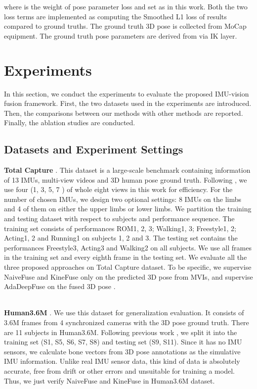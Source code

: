 \documentclass[lettersize,journal]{IEEEtran}
\begin{document}
where  is the weight of pose parameter loss and set as  in this work. Both the two loss terms are implemented as computing the Smoothed L1 loss of results compared to ground truths. The ground truth 3D pose  is collected from MoCap equipment. The ground truth pose parameters  are derived from  via IK layer.
\section{Experiments}

In this section, we conduct the experiments to evaluate the proposed IMU-vision fusion framework. First, the two datasets used in the experiments are introduced. Then, the comparisons between our methods with other methods are reported. Finally, the ablation studies are conducted.

\subsection{Datasets and Experiment Settings}

\noindent \textbf{Total Capture} \cite{trumble2017total}.
\quad This dataset is a large-scale benchmark containing information of 13 IMUs, multi-view videos and 3D human pose ground truth. Following \cite{zhang2020fusing,trumble2017total}, we use four (1, 3, 5, 7 ) of whole eight views in this work for efficiency. For the number of chosen IMUs, we design two optional settings: 8 IMUs on the limbs and 4 of them on either the upper limbs or lower limbs. We partition the training and testing dataset with respect to subjects and performance sequence. The training set consists of performances ROM1, 2, 3; Walking1, 3; Freestyle1, 2; Acting1, 2 and Running1 on subjects 1, 2 and 3. The testing set contains the performances Freestyle3, Acting3 and Walking2 on all subjects. We use all frames in the training set and every eighth frame in the testing set. We evaluate all the three proposed approaches on Total Capture dataset. To be specific, we supervise NaiveFuse and KineFuse only on the predicted 3D pose  from MVIs, and supervise AdaDeepFuse on the fused 3D pose .

~\\
\noindent \textbf{Human3.6M} \cite{ionescu2013human3}.
\quad We use this dataset for generalization evaluation. It consists of 3.6M frames from 4 synchronized cameras with the 3D pose ground truth. There are 11 subjects in Human3.6M. Following previous work \cite{sun2018integral}, we split it into the training set (S1, S5, S6, S7, S8) and testing set (S9, S11). Since it has no IMU sensors, we calculate bone vectors from 3D pose annotations as the simulative IMU information. Unlike real IMU sensor data, this kind of data is absolutely accurate, free from drift or other errors and unsuitable for training a model. Thus, we just verify NaiveFuse and KineFuse in Human3.6M dataset.
\end{document}

